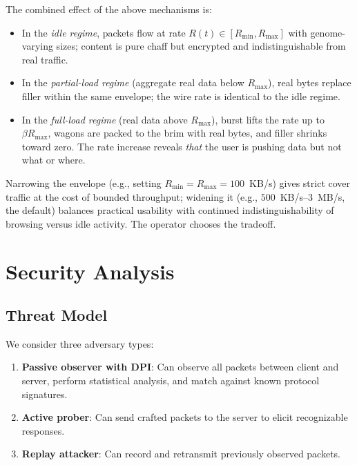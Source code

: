 \documentclass[11pt,a4paper]{article}
\begin{document}
The combined effect of the above mechanisms is:

\begin{itemize}[nosep]
  \item In the \emph{idle regime}, packets flow at rate $R(t) \in [R_{\min}, R_{\max}]$ with genome-varying sizes; content is pure chaff but encrypted and indistinguishable from real traffic.
  \item In the \emph{partial-load regime} (aggregate real data below $R_{\max}$), real bytes replace filler within the same envelope; the wire rate is identical to the idle regime.
  \item In the \emph{full-load regime} (real data above $R_{\max}$), burst lifts the rate up to $\beta R_{\max}$, wagons are packed to the brim with real bytes, and filler shrinks toward zero. The rate increase reveals \emph{that} the user is pushing data but not what or where.
\end{itemize}

Narrowing the envelope (e.g., setting $R_{\min} = R_{\max} = 100$~KB/s) gives strict cover traffic at the cost of bounded throughput; widening it (e.g., $500$~KB/s--$3$~MB/s, the default) balances practical usability with continued indistinguishability of browsing versus idle activity. The operator chooses the tradeoff.

\section{Security Analysis}\label{sec:security}

\subsection{Threat Model}\label{sec:threat}

We consider three adversary types:

\begin{enumerate}[nosep]
  \item \textbf{Passive observer with DPI}: Can observe all packets between client and server, perform statistical analysis, and match against known protocol signatures.
  \item \textbf{Active prober}: Can send crafted packets to the server to elicit recognizable responses.
  \item \textbf{Replay attacker}: Can record and retransmit previously observed packets.
\end{enumerate}
\end{document}

